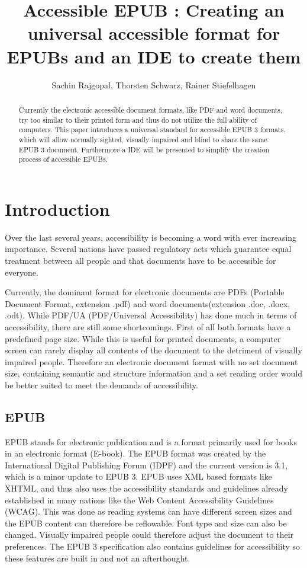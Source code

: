 \documentclass{llncs}
\title{Accessible EPUB : Creating an universal accessible format  for EPUBs and an IDE to create them}
\author{Sachin Rajgopal\inst{1}, Thorsten Schwarz\inst{1}, Rainer Stiefelhagen\inst{1}}
\institute{Karlsruhe Institute of Technology}
\begin{document}
\maketitle

\begin{abstract}
	Currently the electronic accessible document formats, like PDF and word documents, try too similar to their printed form and thus do not utilize the full ability of computers. This paper introduces a universal standard for accessible EPUB 3 formats, which will allow normally sighted, visually impaired and blind to share the same EPUB 3 document. Furthermore a IDE will be presented to simplify the creation process of accessible EPUBs.
\end{abstract}

\section{Introduction}
Over the last several years, accessibility is becoming a word with ever increasing importance. Several nations have passed regulatory acts which guarantee equal treatment between all people and that documents have to be accessible for everyone.
\cite{webaim}

Currently, the dominant format for electronic documents are PDFs (Portable Document Format, extension .pdf) and word documents(extension .doc, .docx, .odt). While PDF/UA (PDF/Universal Accessibility) has done much in terms of accessibility, there are still some shortcomings. First of all both formats have a predefined page size. While this is useful for printed documents, a computer screen can rarely display all contents of the document to the detriment of visually impaired people.\cite{EPUBzone} Therefore an electronic document format with no set document size, containing semantic and structure information and a set reading order would be better suited to meet the demands of accessibility.\cite{EPUBzone}

\subsection{EPUB}
EPUB stands for electronic publication and is a format primarily used for books in an electronic format (E-book). The EPUB format was created by the International Digital Publishing Forum (IDPF) and the current version is 3.1, which is a minor update to EPUB 3.\cite{EPUBspecs} EPUB uses XML based formats like XHTML, and thus also uses the accessibility standards and guidelines already established in many nations like the Web Content Accessibility Guidelines (WCAG). \cite{WCAG} This was done as reading systems can have different screen sizes and the EPUB content can therefore be reflowable. Font type and size can also be changed. Visually impaired people could therefore adjust the document to their preferences. The EPUB 3 specification also contains guidelines for accessibility so these features are built in and not an afterthought.\cite{EPUB3bp}
\end{document}
